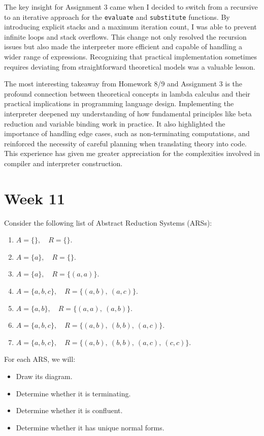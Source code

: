 \documentclass{article}
\theoremstyle{theorem}
\theoremstyle{definition}
\theoremstyle{remark}
\begin{document}
The key insight for Assignment 3 came when I decided to switch from a recursive to an iterative approach for the \texttt{evaluate} and \texttt{substitute} functions. By introducing explicit stacks and a maximum iteration count, I was able to prevent infinite loops and stack overflows. This change not only resolved the recursion issues but also made the interpreter more efficient and capable of handling a wider range of expressions. Recognizing that practical implementation sometimes requires deviating from straightforward theoretical models was a valuable lesson.

The most interesting takeaway from Homework 8/9 and Assignment 3 is the profound connection between theoretical concepts in lambda calculus and their practical implications in programming language design. Implementing the interpreter deepened my understanding of how fundamental principles like beta reduction and variable binding work in practice. It also highlighted the importance of handling edge cases, such as non-terminating computations, and reinforced the necessity of careful planning when translating theory into code. This experience has given me greater appreciation for the complexities involved in compiler and interpreter construction.

\section*{Week 11}

Consider the following list of Abstract Reduction Systems (ARSs):

\begin{enumerate}
    \item \( A = \{\},\quad R = \{\} \).
    \item \( A = \{a\},\quad R = \{\} \).
    \item \( A = \{a\},\quad R = \{(a, a)\} \).
    \item \( A = \{a, b, c\},\quad R = \{(a, b),\ (a, c)\} \).
    \item \( A = \{a, b\},\quad R = \{(a, a),\ (a, b)\} \).
    \item \( A = \{a, b, c\},\quad R = \{(a, b),\ (b, b),\ (a, c)\} \).
    \item \( A = \{a, b, c\},\quad R = \{(a, b),\ (b, b),\ (a, c),\ (c, c)\} \).
\end{enumerate}

For each ARS, we will:

\begin{itemize}
    \item Draw its diagram.
    \item Determine whether it is terminating.
    \item Determine whether it is confluent.
    \item Determine whether it has unique normal forms.
\end{itemize}
\end{document}
